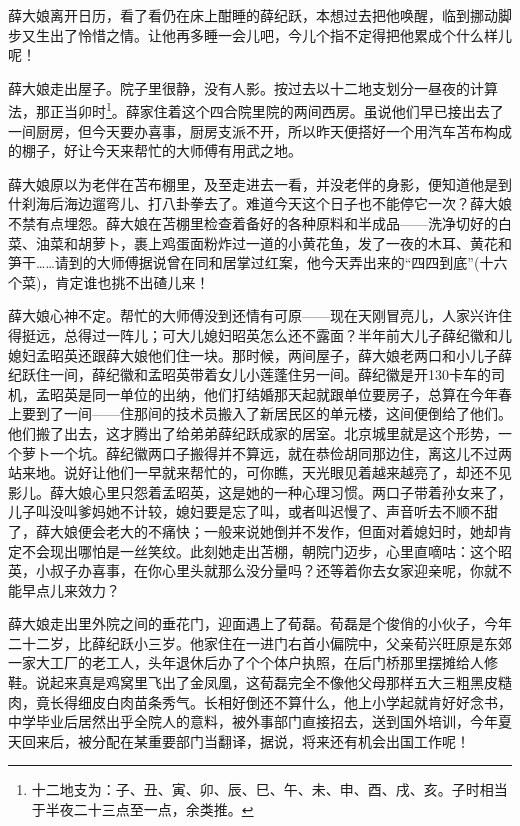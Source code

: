 \par 薛大娘离开日历，看了看仍在床上酣睡的薛纪跃，本想过去把他唤醒，临到挪动脚步又生出了怜惜之情。让他再多睡一会儿吧，今儿个指不定得把他累成个什么样儿呢！
\par 薛大娘走出屋子。院子里很静，没有人影。按过去以十二地支划分一昼夜的计算法，那正当卯时\footnote{十二地支为：子、丑、寅、卯、辰、巳、午、未、申、酉、戌、亥。子时相当于半夜二十三点至一点，余类推。}。薛家住着这个四合院里院的两间西房。虽说他们早已接出去了一间厨房，但今天要办喜事，厨房支派不开，所以昨天便搭好一个用汽车苫布构成的棚子，好让今天来帮忙的大师傅有用武之地。
\par 薛大娘原以为老伴在苫布棚里，及至走进去一看，并没老伴的身影，便知道他是到什刹海后海边遛弯儿、打八卦拳去了。难道今天这个日子也不能停它一次？薛大娘不禁有点埋怨。薛大娘在苫棚里检查着备好的各种原料和半成品——洗净切好的白菜、油菜和胡萝卜，裹上鸡蛋面粉炸过一道的小黄花鱼，发了一夜的木耳、黄花和笋干……请到的大师傅据说曾在同和居掌过红案，他今天弄出来的“四四到底”(十六个菜)，肯定谁也挑不出碴儿来！
\par 薛大娘心神不定。帮忙的大师傅没到还情有可原——现在天刚冒亮儿，人家兴许住得挺远，总得过一阵儿；可大儿媳妇昭英怎么还不露面？半年前大儿子薛纪徽和儿媳妇孟昭英还跟薛大娘他们住一块。那时候，两间屋子，薛大娘老两口和小儿子薛纪跃住一间，薛纪徽和孟昭英带着女儿小莲蓬住另一间。薛纪徽是开130卡车的司机，孟昭英是同一单位的出纳，他们打结婚那天起就跟单位要房子，总算在今年春上要到了一间——住那间的技术员搬入了新居民区的单元楼，这间便倒给了他们。他们搬了出去，这才腾出了给弟弟薛纪跃成家的居室。北京城里就是这个形势，一个萝卜一个坑。薛纪徽两口子搬得并不算远，就在恭俭胡同那边住，离这儿不过两站来地。说好让他们一早就来帮忙的，可你瞧，天光眼见着越来越亮了，却还不见影儿。薛大娘心里只怨着孟昭英，这是她的一种心理习惯。两口子带着孙女来了，儿子叫没叫爹妈她不计较，媳妇要是忘了叫，或者叫迟慢了、声音听去不顺不甜了，薛大娘便会老大的不痛快；一般来说她倒并不发作，但面对着媳妇时，她却肯定不会现出哪怕是一丝笑纹。此刻她走出苫棚，朝院门迈步，心里直嘀咕：这个昭英，小叔子办喜事，在你心里头就那么没分量吗？还等着你去女家迎亲呢，你就不能早点儿来效力？
\par 薛大娘走出里外院之间的垂花门，迎面遇上了荀磊。荀磊是个俊俏的小伙子，今年二十二岁，比薛纪跃小三岁。他家住在一进门右首小偏院中，父亲荀兴旺原是东郊一家大工厂的老工人，头年退休后办了个个体户执照，在后门桥那里摆摊给人修鞋。说起来真是鸡窝里飞出了金凤凰，这荀磊完全不像他父母那样五大三粗黑皮糙肉，竟长得细皮白肉苗条秀气。长相好倒还不算什么，他上小学起就肯好好念书，中学毕业后居然出乎全院人的意料，被外事部门直接招去，送到国外培训，今年夏天回来后，被分配在某重要部门当翻译，据说，将来还有机会出国工作呢！
